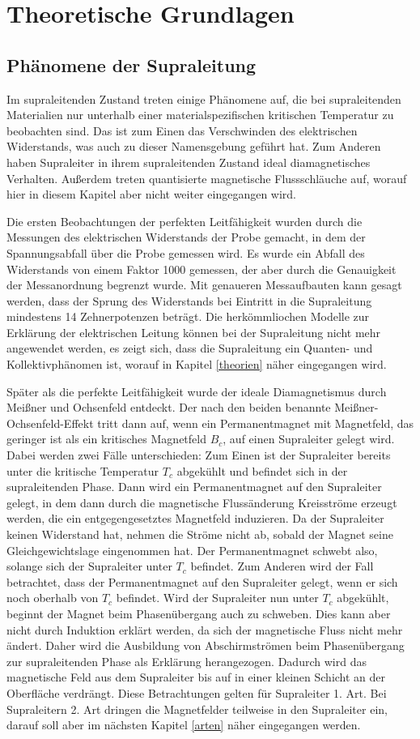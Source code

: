 \section{Theoretische Grundlagen}
\subsection{Phänomene der Supraleitung}
Im supraleitenden Zustand treten einige Phänomene auf, die bei supraleitenden Materialien nur unterhalb einer materialspezifischen kritischen Temperatur zu beobachten sind. Das ist zum Einen das Verschwinden des elektrischen Widerstands, was auch zu dieser Namensgebung geführt hat. Zum Anderen haben Supraleiter in ihrem supraleitenden Zustand ideal diamagnetisches Verhalten. Außerdem treten quantisierte magnetische Flussschläuche auf, worauf hier in diesem Kapitel aber nicht weiter eingegangen wird.

Die ersten Beobachtungen der perfekten Leitfähigkeit wurden durch die Messungen des elektrischen Widerstands der Probe gemacht, in dem der Spannungsabfall über die Probe gemessen wird. Es wurde ein Abfall des Widerstands von einem Faktor 1000 gemessen, der aber durch die Genauigkeit der Messanordnung begrenzt wurde. Mit genaueren Messaufbauten kann gesagt werden, dass der Sprung des Widerstands bei Eintritt in die Supraleitung mindestens 14 Zehnerpotenzen beträgt\cite{supraleitung}. Die herkömmliochen Modelle zur Erklärung der elektrischen Leitung können bei der Supraleitung nicht mehr angewendet werden, es zeigt sich, dass die Supraleitung ein Quanten- und Kollektivphänomen ist, worauf in Kapitel \ref{theorien} näher eingegangen wird.

Später als die perfekte Leitfähigkeit wurde der ideale Diamagnetismus durch Meißner und Ochsenfeld entdeckt. Der nach den beiden benannte Meißner-Ochsenfeld-Effekt tritt dann auf, wenn ein Permanentmagnet mit Magnetfeld, das geringer ist als ein kritisches Magnetfeld $B_c$, auf einen Supraleiter gelegt wird. Dabei werden zwei Fälle unterschieden: Zum Einen ist der Supraleiter bereits unter die kritische Temperatur $T_c$ abgekühlt und befindet sich in der supraleitenden Phase. Dann wird ein Permanentmagnet auf den Supraleiter gelegt, in dem dann durch die magnetische Flussänderung Kreisströme erzeugt werden, die ein entgegengesetztes Magnetfeld induzieren. Da der Supraleiter keinen Widerstand hat, nehmen die Ströme nicht ab, sobald der Magnet seine Gleichgewichtslage eingenommen hat. Der Permanentmagnet schwebt also, solange sich der Supraleiter unter $T_c$ befindet. Zum Anderen wird der Fall betrachtet, dass der Permanentmagnet auf den Supraleiter gelegt, wenn er sich noch oberhalb von $T_c$ befindet. Wird der Supraleiter nun unter $T_c$ abgekühlt, beginnt der Magnet beim Phasenübergang auch zu schweben. Dies kann aber nicht durch Induktion erklärt werden, da sich der magnetische Fluss nicht mehr ändert. Daher wird die Ausbildung von Abschirmströmen beim Phasenübergang zur supraleitenden Phase als Erklärung herangezogen. Dadurch wird das magnetische Feld aus dem Supraleiter bis auf in einer kleinen Schicht an der Oberfläche verdrängt. Diese Betrachtungen gelten für Supraleiter 1. Art. Bei Supraleitern 2. Art dringen die Magnetfelder teilweise in den Supraleiter ein, darauf soll aber im nächsten Kapitel \ref{arten} näher eingegangen werden.
